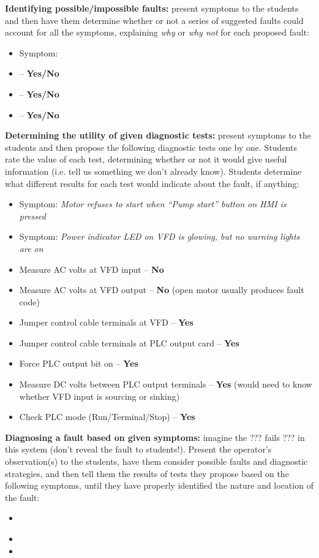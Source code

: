 \vskip 10pt


\noindent
{\bf Identifying possible/impossible faults:} present symptoms to the students and then have them determine whether or not a series of suggested faults could account for all the symptoms, explaining {\it why} or {\it why not} for each proposed fault:

\begin{itemize}
\item{} Symptom: {\it }
\item{}  -- {\bf Yes/No}
\item{}  -- {\bf Yes/No}
\item{}  -- {\bf Yes/No}
\end{itemize}


\vskip 10pt


\noindent
{\bf Determining the utility of given diagnostic tests:} present symptoms to the students and then propose the following diagnostic tests one by one.  Students rate the value of each test, determining whether or not it would give useful information (i.e. tell us something we don't already know).  Students determine what different results for each test would indicate about the fault, if anything:

\begin{itemize}
\item{} Symptom: {\it Motor refuses to start when ``Pump start'' button on HMI is pressed}
\item{} Symptom: {\it Power indicator LED on VFD is glowing, but no warning lights are on}
\item{} Measure AC volts at VFD input -- {\bf No}
\item{} Measure AC volts at VFD output -- {\bf No} (open motor usually produces fault code)
\item{} Jumper control cable terminals at VFD -- {\bf Yes}
\item{} Jumper control cable terminals at PLC output card -- {\bf Yes}
\item{} Force PLC output bit on -- {\bf Yes}
\item{} Measure DC volts between PLC output terminals -- {\bf Yes} (would need to know whether VFD input is sourcing or sinking)
\item{} Check PLC mode (Run/Terminal/Stop) -- {\bf Yes}
\end{itemize}


\vskip 10pt


\noindent
{\bf Diagnosing a fault based on given symptoms:} imagine the ??? fails ??? in this system (don't reveal the fault to students!).  Present the operator's observation(s) to the students, have them consider possible faults and diagnostic strategies, and then tell them the results of tests they propose based on the following symptoms, until they have properly identified the nature and location of the fault:

\begin{itemize}
\item{} {\it }
\item{} 
\item{} 
\end{itemize}




